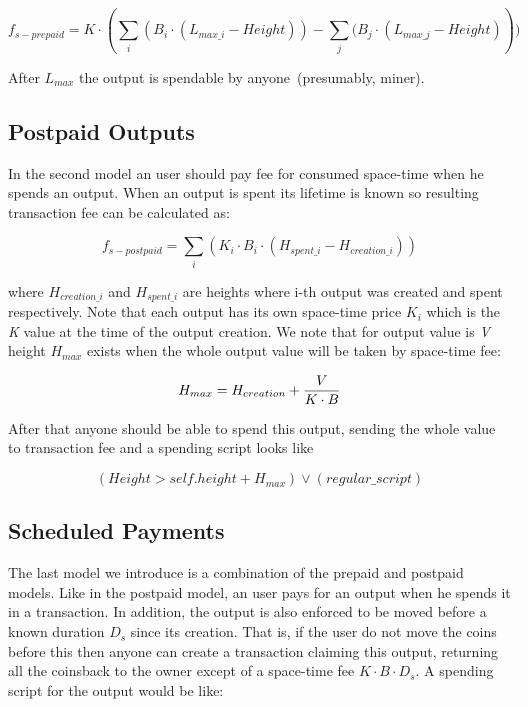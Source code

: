 \documentclass[]{llncs}   %
\newcommand{\authnote}[2]{\marginpar{\parbox{\marginparwidth}{\tiny %
  \textsf{#1 {\textcolor{blue}{notes: #2}}}}}%
  \textcolor{blue}{\textbf{\dag}}}
\newcommand{\authnote}[2]{
  \textsf{#1 \textcolor{blue}{: #2}}}
\newcommand{\authnote}[2]{}
\newcommand{\knote}[1]{{\authnote{\textcolor{green}{Alex notes}}{#1}}}
\begin{document}
\begin{equation}
f_{s-prepaid} = K \cdot (\sum_i{(B_i \cdot (L_{max\_i} - Height))} - \sum_j{(B_j \cdot (L_{max\_j} - Height)}))
\end{equation}

\knote{Height is subjective here, write about that}

After $L_{max}$ the output is spendable by anyone~(presumably, miner).

\subsection{Postpaid Outputs}
\label{sec-postpaid}


In the second model an user should pay fee for consumed space-time when he spends an output. When an output is spent its lifetime is known so resulting transaction fee can be calculated as:

\begin{equation}
f_{s-postpaid} = \sum_i{(K_i \cdot B_i \cdot (H_{spent\_i} - H_{creation\_i}))}
\end{equation}

where $H_{creation\_i}$ and $H_{spent\_i}$ are heights where i-th output was created and spent respectively. Note that each output has its own space-time price \textit{$K_i$} which is the \textit{K} value at the time of the output creation. We note that for output value is \textit{V} height \textit{$H_{max}$} exists  when the whole output value will be taken by space-time fee:

\begin{equation}
H_{max} = {H_{creation} + {V \over {K \cdot B}}}
\end{equation}

After that anyone should be able to spend this output, sending the whole value to transaction fee and a spending script looks like

\begin{equation}
(Height > self.height + H_{max}) \lor (regular\_script)
\end{equation}

\subsection{Scheduled Payments}
\label{sec-scheduled}

The last model we introduce is a combination of the prepaid and postpaid models. Like in the postpaid model, an user pays for an output when he spends it in a transaction. In addition, the output is also enforced to be moved before a known duration $D_{s}$ since its creation. That is, if the user do not move the coins before this then anyone can create a transaction claiming this output, returning all the coinsback to the owner except of a space-time fee ${K \cdot B \cdot D_{s}}$. A spending script for the output would be like:
\end{document}
